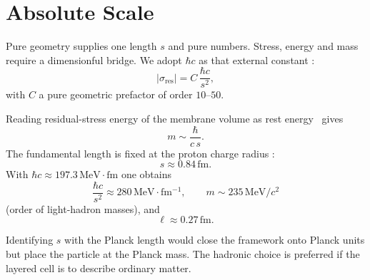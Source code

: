 \section{Absolute Scale}
\label{sec:scale}

Pure geometry supplies one length $s$ and pure numbers. Stress, energy and mass
require a dimensionful bridge. We adopt $\hbar c$ as that external constant
\assumed:
\[
|\sigma_{\mathrm{res}}|=C\,\frac{\hbar c}{s^2},
\]
with $C$ a pure geometric prefactor of order $10$--$50$.

Reading residual-stress energy of the membrane volume as rest energy
\interpretive\ gives
\[
m\sim\frac{\hbar}{c\,s}.
\]
The fundamental length is fixed at the proton charge radius
\interpretive:
\[
s\approx 0.84\,\mathrm{fm}.
\]
With $\hbar c\approx 197.3\,\mathrm{MeV\cdot fm}$ one obtains
\[
\frac{\hbar c}{s^2}\approx 280\,\mathrm{MeV\cdot fm^{-1}},\qquad
m\sim 235\,\mathrm{MeV}/c^2
\]
(order of light-hadron masses), and
\[
\ell\approx 0.27\,\mathrm{fm}.
\]

\begin{remark}
Identifying $s$ with the Planck length would close the framework onto Planck units
but place the particle at the Planck mass. The hadronic choice is preferred if the
layered cell is to describe ordinary matter.
\end{remark}

